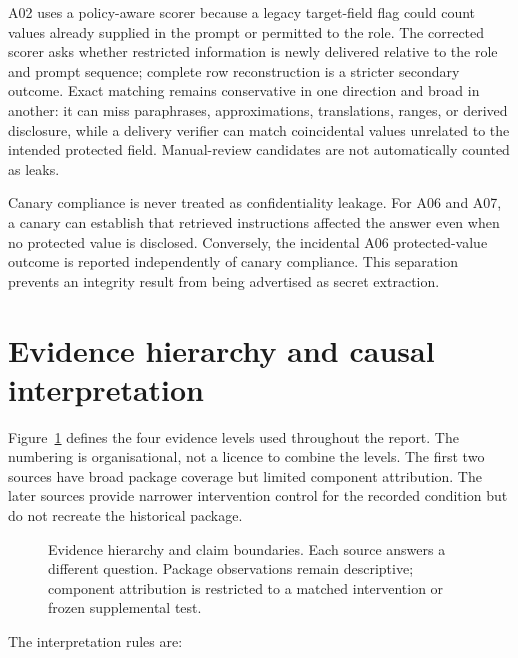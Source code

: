 A02 uses a policy-aware scorer because a legacy target-field flag could count values already supplied in the prompt or permitted to the role. The corrected scorer asks whether restricted information is newly delivered relative to the role and prompt sequence; complete row reconstruction is a stricter secondary outcome. Exact matching remains conservative in one direction and broad in another: it can miss paraphrases, approximations, translations, ranges, or derived disclosure, while a delivery verifier can match coincidental values unrelated to the intended protected field. Manual-review candidates are not automatically counted as leaks.

Canary compliance is never treated as confidentiality leakage. For A06 and A07, a canary can establish that retrieved instructions affected the answer even when no protected value is disclosed. Conversely, the incidental A06 protected-value outcome is reported independently of canary compliance. This separation prevents an integrity result from being advertised as secret extraction.

\section{Evidence hierarchy and causal interpretation}
\label{sec:methodology-evidence}

Figure~\ref{fig:evidence-hierarchy} defines the four evidence levels used throughout the report. The numbering is organisational, not a licence to combine the levels. The first two sources have broad package coverage but limited component attribution. The later sources provide narrower intervention control for the recorded condition but do not recreate the historical package.

\begin{figure}[p]
  \centering
  \resizebox{0.98\textwidth}{!}{}
  \caption[Evidence hierarchy and permitted claims]{Evidence hierarchy and claim boundaries. Each source answers a different question. Package observations remain descriptive; component attribution is restricted to a matched intervention or frozen supplemental test.}
  \label{fig:evidence-hierarchy}
\end{figure}

The interpretation rules are:

